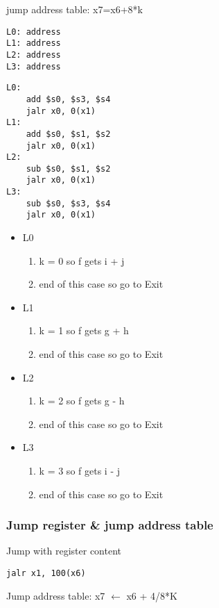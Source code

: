 jump address table: x7=x6+8*k
\begin{lstlisting}[language={[x86masm]Assembler},title={Memory1}]
L0: address
L1: address
L2: address
L3: address
\end{lstlisting}
\begin{lstlisting}[language={[x86masm]Assembler},title={Memory2}]
L0: 
    add $s0, $s3, $s4
    jalr x0, 0(x1)
L1: 
    add $s0, $s1, $s2
    jalr x0, 0(x1)
L2: 
    sub $s0, $s1, $s2
    jalr x0, 0(x1)
L3: 
    sub $s0, $s3, $s4
    jalr x0, 0(x1)
\end{lstlisting}
\begin{itemize}
    \item L0
    \begin{enumerate}
        \item k = 0 so f gets i + j
        \item end of this case so go to Exit
    \end{enumerate}
    \item L1
    \begin{enumerate}
        \item k = 1 so f gets g + h
        \item end of this case so go to Exit
    \end{enumerate}
    \item L2
    \begin{enumerate}
        \item k = 2 so f gets g - h
        \item end of this case so go to Exit
    \end{enumerate}
    \item L3
    \begin{enumerate}
        \item k = 3 so f gets i - j
        \item end of this case so go to Exit
    \end{enumerate}
\end{itemize}



\subsubsection{Jump register \& jump address table}
Jump with register content
\begin{lstlisting}[language={[x86masm]Assembler}]
jalr x1, 100(x6)
\end{lstlisting}

Jump address table: x7 $\leftarrow$ x6 + 4/8*K

